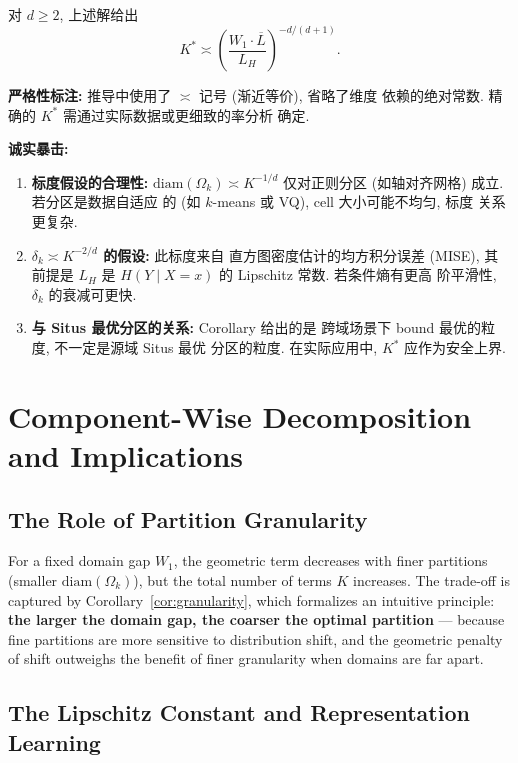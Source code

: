 \documentclass[12pt,a4paper]{article}
\newcommand{\Wass}{W_1}
\newcommand{\diam}{\mathrm{diam}}
\newcommand{\critique}{\medskip\noindent\textbf{诚实暴击: }}
\newcommand{\annotation}{\medskip\noindent\textbf{严格性标注: }}
\begin{document}
对 $d\geq2$, 上述解给出
\begin{equation}\label{eq:opt-K-derived}
    K^* \asymp \left(\frac{\Wass\cdot\overline{L}}{L_H}\right)^{-d/(d+1)}.
\end{equation}
\checkmark

\medskip\noindent
\annotation 推导中使用了 $\asymp$ 记号 (渐近等价), 省略了维度
依赖的绝对常数. 精确的 $K^*$ 需通过实际数据或更细致的率分析
确定.

\critique
\begin{enumerate}
    \item \textbf{标度假设的合理性:} $\diam(\Omega_k)\asymp K^{-1/d}$
          仅对正则分区 (如轴对齐网格) 成立. 若分区是数据自适应
          的 (如 $k$-means 或 VQ), cell 大小可能不均匀, 标度
          关系更复杂.
    \item \textbf{$\delta_k\asymp K^{-2/d}$ 的假设:} 此标度来自
          直方图密度估计的均方积分误差 (MISE), 其前提是 $L_H$
          是 $H(Y\mid X=x)$ 的 Lipschitz 常数. 若条件熵有更高
          阶平滑性, $\delta_k$ 的衰减可更快.
    \item \textbf{与 Situs 最优分区的关系:} Corollary 给出的是
          跨域场景下 bound 最优的粒度, 不一定是源域 Situs 最优
          分区的粒度. 在实际应用中, $K^*$ 应作为安全上界.
\end{enumerate}


\section{Component-Wise Decomposition and Implications}
\label{sec:decomposition}

\subsection{The Role of Partition Granularity}

For a fixed domain gap $\Wass$, the geometric term decreases with finer
partitions (smaller $\diam(\Omega_k)$), but the total number of terms $K$
increases.  The trade-off is captured by Corollary~\ref{cor:granularity},
which formalizes an intuitive principle: \textbf{the larger the
domain gap, the coarser the optimal partition} — because fine partitions
are more sensitive to distribution shift, and the geometric penalty of
shift outweighs the benefit of finer granularity when domains are far apart.

\subsection{The Lipschitz Constant and Representation Learning}
\end{document}
